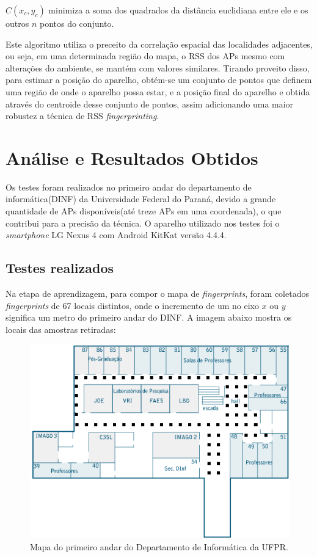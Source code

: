   $C(x_c,y_c)$ minimiza a soma dos quadrados da distância euclidiana entre ele e os outros $n$ pontos do conjunto\cite{centroid}.
  
      Este algoritmo utiliza o preceito da correlação espacial das localidades adjacentes\cite{fingerPrint2}, 
  ou seja, em uma determinada região do mapa, o RSS dos APs
  mesmo com alterações do ambiente, se mantém com valores similares. Tirando proveito disso, para estimar a posição do aparelho, 
  obtém-se um conjunto de pontos que definem uma região de onde o aparelho possa estar, e a posição final do aparelho 
  e obtida através do centroide desse conjunto de pontos, assim adicionando uma maior robustez 
  a técnica de RSS \textit{fingerprinting}.
  
  \section{Análise e Resultados Obtidos}
 
  Os testes foram realizados no primeiro andar do departamento de informática(DINF) da Universidade Federal do Paraná, devido a 
  grande quantidade de APs disponíveis(até treze APs em uma coordenada), o que contribui para a precisão da técnica.
  O aparelho utilizado nos testes foi o \textit{smartphone} LG Nexus 4 com Android KitKat versão 4.4.4.
  \clearpage
  \subsection{Testes realizados}
  Na etapa de aprendizagem, para compor o mapa de \textit{fingerprints}, foram coletados \textit{fingerprints} de 67 locais distintos,
  onde o incremento de um no eixo $x$ ou $y$ significa um metro do primeiro andar do DINF. 
  A imagem abaixo mostra os locais das amostras retiradas:
   
   \begin{figure}[hbt]
  \centering
  \includegraphics[scale=0.9]{images/TTmapadinf_andar1_492x327.png}
  \caption{Mapa do primeiro andar do Departamento de Informática da UFPR.}
  \label{fig:mapaDinf}
  \end{figure}
     \clearpage
     
